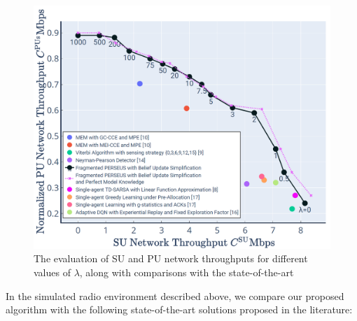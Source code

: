 \documentclass[12pt, draftcls, onecolumn]{IEEEtran}
\begin{document}
\begin{figure} [htb]
    \centerline{
    \includegraphics[width = 0.8\linewidth]{figures/Performance_Single_Agent_Comparisons.png}}
    \caption{The evaluation of SU and PU network throughputs for different values of $\lambda$, along with comparisons with the state-of-the-art}
    \label{Fig. 4}
\end{figure}
In the simulated radio environment described above, we compare our proposed algorithm with the following state-of-the-art solutions proposed in the literature:
\end{document}
